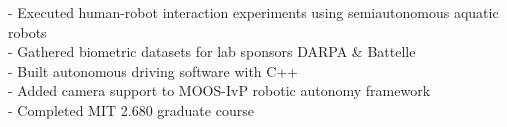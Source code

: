 \documentclass[10pt, a4paper]{article}
\newcommand{\years}[1]{\marginnote{\scriptsize #1}}
\begin{document}
- Executed human-robot interaction experiments using semiautonomous aquatic robots\\
- Gathered biometric datasets for lab sponsors DARPA \& Battelle\\
- Built autonomous driving software with C++\\
- Added camera support to MOOS-IvP robotic autonomy framework\\
- Completed MIT 2.680 graduate course\\
\end{document}
